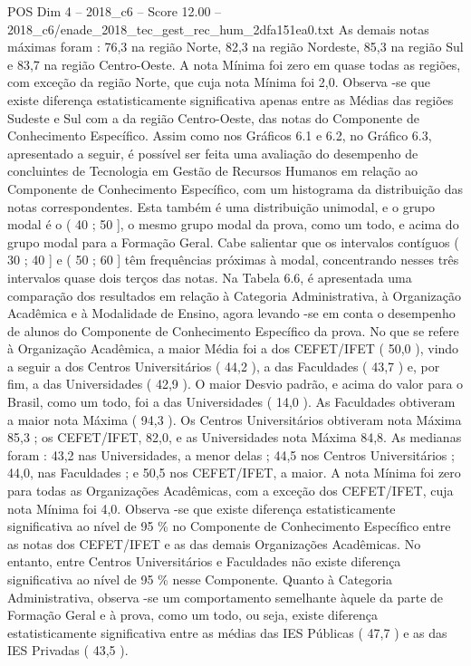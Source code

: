 \begin{textsample}{POS Dim 4 – 2018\_c6 – Score 12.00 – 2018\_c6/enade\_2018\_tec\_gest\_rec\_hum\_2dfa151ea0.txt}
As demais notas máximas foram : 76,3 na região Norte, 82,3 na região Nordeste, 85,3 na região Sul e 83,7 na região Centro-Oeste.
A nota Mínima foi zero em quase todas as regiões, com exceção da região Norte, que cuja nota Mínima foi 2,0.
Observa -se que existe diferença estatisticamente significativa apenas entre as Médias das regiões Sudeste e Sul com a da região Centro-Oeste, das notas do Componente de Conhecimento Específico.
Assim como nos Gráficos 6.1 e 6.2, no Gráfico 6.3, apresentado a seguir, é possível ser feita uma avaliação do desempenho de concluintes de Tecnologia em Gestão de Recursos Humanos em relação ao Componente de Conhecimento Específico, com um histograma da distribuição das notas correspondentes.
Esta também é uma distribuição unimodal, e o grupo modal é o ( 40 ; 50 ], o mesmo grupo modal da prova, como um todo, e acima do grupo modal para a Formação Geral.
Cabe salientar que os intervalos contíguos ( 30 ; 40 ] e ( 50 ; 60 ] têm frequências próximas à modal, concentrando nesses três intervalos quase dois terços das notas.
Na Tabela 6.6, é apresentada uma comparação dos resultados em relação à Categoria Administrativa, à Organização Acadêmica e à Modalidade de Ensino, agora levando -se em conta o desempenho de alunos do Componente de Conhecimento Específico da prova.
No que se refere à Organização Acadêmica, a maior Média foi a dos CEFET/IFET ( 50,0 ), vindo a seguir a dos Centros Universitários ( 44,2 ), a das Faculdades ( 43,7 ) e, por fim, a das Universidades ( 42,9 ).
O maior Desvio padrão, e acima do valor para o Brasil, como um todo, foi a das Universidades ( 14,0 ).
As Faculdades obtiveram a maior nota Máxima ( 94,3 ).
Os Centros Universitários obtiveram nota Máxima 85,3 ; os CEFET/IFET, 82,0, e as Universidades nota Máxima 84,8.
As medianas foram : 43,2 nas Universidades, a menor delas ; 44,5 nos Centros Universitários ; 44,0, nas Faculdades ; e 50,5 nos CEFET/IFET, a maior.
A nota Mínima foi zero para todas as Organizações Acadêmicas, com a exceção dos CEFET/IFET, cuja nota Mínima foi 4,0.
Observa -se que existe diferença estatisticamente significativa ao nível de 95 \% no Componente de Conhecimento Específico entre as notas dos CEFET/IFET e as das demais Organizações Acadêmicas.
No entanto, entre Centros Universitários e Faculdades não existe diferença significativa ao nível de 95 \% nesse Componente.
Quanto à Categoria Administrativa, observa -se um comportamento semelhante àquele da parte de Formação Geral e à prova, como um todo, ou seja, existe diferença estatisticamente significativa entre as médias das IES Públicas ( 47,7 ) e as das IES Privadas ( 43,5 ).

\end{textsample}
